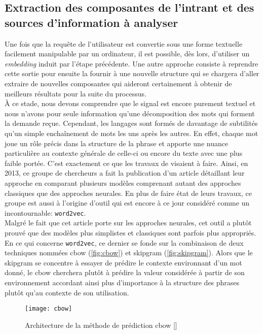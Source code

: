 \subsection{Extraction des composantes de l'intrant et des sources d'information à analyser}
Une fois que la requête de l'utilisateur est convertie sous une forme textuelle facilement manipulable par un ordinateur, il est possible, dès lors, d'utiliser un \textit{embedding} induit par l'étape précédente. Une autre approche consiste à reprendre cette sortie pour ensuite la fournir à une nouvelle structure qui se chargera d'aller extraire de nouvelles composantes qui aideront certainement à obtenir de meilleurs résultats pour la suite du processus. \\

À ce stade, nous devons comprendre que le signal est encore purement textuel et nous n'avons pour seule information qu'une décomposition des mots qui forment la demande reçue. Cependant, les langages sont formés de davantage de subtilités qu'un simple enchaînement de mots les uns après les autres. En effet, chaque mot joue un rôle précis dans la structure de la phrase et apporte une nuance particulière au contexte générale de celle-ci ou encore du texte avec une plus faible portée. C'est exactement ce que les travaux de \cite{word2vec} visaient à faire. Ainsi, en 2013, ce groupe de chercheurs a fait la publication d'un article détaillant leur approche en comparant plusieurs modèles comprenant autant des approches classiques que des approches neurales. En plus de faire état de leurs travaux, ce groupe est aussi à l'origine d'outil qui est encore à ce jour considéré comme un incontournable: \texttt{word2vec}. \\

Malgré le fait que cet article porte sur les approches neurales, cet outil a plutôt prouvé que des modèles plus simplistes et classiques sont parfois plus appropriés. En ce qui concerne \texttt{word2vec}, ce dernier se fonde sur la combinaison de deux techniques nommées \gls{cbow} (\autoref{fig:cbow}) et \gls{skipgram} (\autoref{fig:skipgram}). Alors que le \gls{skipgram} se concentre à essayer de prédire le contexte environnant d'un mot donné, le \gls{cbow} cherchera plutôt à prédire la valeur considérée à partir de son environnement accordant ainsi plus d’importance à la structure des phrases plutôt qu’au contexte de son utilisation.\\

\begin{figure}[ht]
  \centering
  \texttt{[image: cbow]}
  \caption{Architecture de la méthode de prédiction \gls{cbow} []}
  \label{fig:cbow}
\end{figure}

